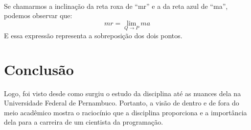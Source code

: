 \documentclass{article}
\begin{document}
\paragraph{}
Se chamarmos a inclinação da reta roxa de “mr” e a da reta azul de “ma”, podemos observar que: \[mr = \lim_{Q \to P} ma\]
E essa expressão representa a sobreposição dos dois pontos.


\section{Conclusão}
\paragraph{}
Logo, foi visto desde como surgiu o estudo da disciplina até as nuances dela na Universidade Federal de Pernambuco. Portanto, a visão de dentro e de fora do meio acadêmico mostra o raciocínio que a disciplina proporciona e a importância dela para a carreira de um cientista da programação.



\end{document}
